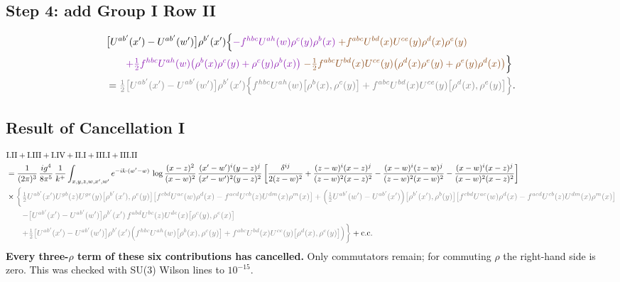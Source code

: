 \documentclass[10pt]{article}
\newcommand{\Vi}[1]{{\color{cV}#1}}
\newcommand{\Br}[1]{{\color{cN}#1}}
\newcommand{\Gr}[1]{{\color{cX}#1}}
\begin{document}
\subsection*{Step 4: add Group I Row II}
\begin{align}
&\big[U^{ab'}(x')-U^{ab'}(w')\big]\rho^{b'}(x')\Big\{\Vi{-f^{hbc}U^{ah}(w)\rho^{c}(y)\rho^{b}(x)}\;\Br{+f^{abc}U^{bd}(x)U^{ce}(y)\rho^{d}(x)\rho^{e}(y)}\notag\\
&\qquad\Vi{+\tfrac12f^{hbc}U^{ah}(w)\big(\rho^{b}(x)\rho^{c}(y)+\rho^{c}(y)\rho^{b}(x)\big)}\;\Br{-\tfrac12f^{abc}U^{bd}(x)U^{ce}(y)\big(\rho^{d}(x)\rho^{e}(y)+\rho^{e}(y)\rho^{d}(x)\big)}\Big\}\notag\\
&=\Gr{\tfrac12\big[U^{ab'}(x')-U^{ab'}(w')\big]\rho^{b'}(x')\Big\{f^{hbc}U^{ah}(w)\big[\rho^{b}(x),\rho^{c}(y)\big]+f^{abc}U^{bd}(x)U^{ce}(y)\big[\rho^{d}(x),\rho^{e}(y)\big]\Big\}}.
\end{align}

\subsection*{Result of Cancellation I}
\begin{align}
&\text{I.II}+\text{I.III}+\text{I.IV}+\text{II.I}+\text{III.I}+\text{III.II}\notag\\
&=\frac{1}{(2\pi)^{3}}\,\frac{ig^{4}}{8\pi^{5}}\,\frac{1}{k^{+}}\int_{x,y,z,w,x',w'}e^{-ik\cdot(w'-w)}\,\log\frac{(x-z)^{2}}{(x-w)^{2}}\,\frac{(x'-w')^{i}(y-z)^{j}}{(x'-w')^{2}(y-z)^{2}}\,\bigg[\frac{\delta^{ij}}{2(z-w)^{2}}+\frac{(z-w)^{i}(x-z)^{j}}{(z-w)^{2}(x-z)^{2}}-\frac{(x-w)^{i}(z-w)^{j}}{(z-w)^{2}(x-w)^{2}}-\frac{(x-w)^{i}(x-z)^{j}}{(x-w)^{2}(x-z)^{2}}\bigg]\notag\\
&\times\Gr{\bigg\{\tfrac12U^{ab'}(x')U^{gb}(z)U^{ge}(y)\big[\rho^{b'}(x'),\rho^{e}(y)\big]\big[f^{cbd}U^{ac}(w)\rho^{d}(x)-f^{acd}U^{cb}(z)U^{dm}(x)\rho^{m}(x)\big]+\Big(\tfrac12U^{ab'}(w')-U^{ab'}(x')\Big)\big[\rho^{b'}(x'),\rho^{b}(y)\big]\big[f^{cbd}U^{ac}(w)\rho^{d}(x)-f^{acd}U^{cb}(z)U^{dm}(x)\rho^{m}(x)\big]}\notag\\
&\qquad\Gr{-\big[U^{ab'}(x')-U^{ab'}(w')\big]\rho^{b'}(x')\,f^{abd}U^{bc}(z)U^{de}(x)\big[\rho^{c}(y),\rho^{e}(x)\big]}\notag\\
&\qquad\Gr{+\tfrac12\big[U^{ab'}(x')-U^{ab'}(w')\big]\rho^{b'}(x')\Big(f^{hbc}U^{ah}(w)\big[\rho^{b}(x),\rho^{c}(y)\big]+f^{abc}U^{bd}(x)U^{ce}(y)\big[\rho^{d}(x),\rho^{e}(y)\big]\Big)\bigg\}}+{\rm c.c.}
\end{align}
\textbf{Every three-$\rho$ term of these six contributions has cancelled.} Only commutators remain; for commuting $\rho$ the right-hand side is zero. This was checked with SU(3) Wilson lines to $10^{-15}$.
\end{document}
